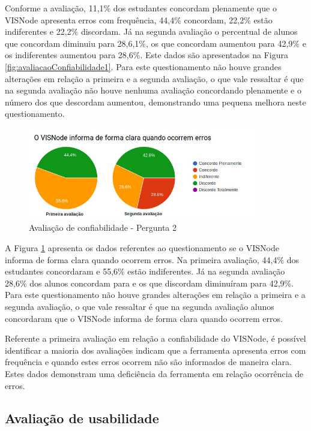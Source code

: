 \documentclass[
	12pt,				%
	oneside,			%
	a4paper,			%
	english,			%
	french,				%
	spanish,			%
	brazil,				%
	]{abntex2}
\begin{document}
Conforme a avaliação, 11,1\% dos estudantes concordam plenamente que o VISNode apresenta erros com frequência, 44,4\% concordam, 22,2\% estão indiferentes e 22,2\% discordam. Já na segunda avaliação o percentual de alunos que concordam diminuiu para 28,6,1\%, os que concordam aumentou para 42,9\% e os indiferentes aumentou para 28,6\%. Este dados são apresentados na Figura  \ref{fig:avaliacaoConfiabilidade1}.
Para este questionamento não houve grandes alterações em relação a primeira e a segunda avaliação, o que vale ressaltar é que na segunda avaliação não houve nenhuma avaliação concordando plenamente e o número dos que descordam aumentou, demonstrando uma pequena melhora neste questionamento.

\begin{figure}[H]
\centering
\caption{Avaliação de confiabilidade - Pergunta 2}\label{fig:avaliacaoConfiabilidade2}
\includegraphics[width=0.9\textwidth]{imagens/avaliacoes/avaliacao_confiabilidade_2.jpg}
\sourceAuthor
\end{figure}

A Figura \ref{fig:avaliacaoConfiabilidade2} apresenta os dados referentes ao questionamento se o VISNode informa de forma clara quando ocorrem erros. Na primeira avaliação, 44,4\% dos estudantes concordaram e 55,6\% estão indiferentes. Já na segunda avaliação 28,6\% dos alunos concordam  para e os que discordam diminuíram para 42,9\%. Para este questionamento não houve grandes alterações em relação a primeira e a segunda avaliação, o que vale ressaltar é que na segunda avaliação alunos concordaram que o VISNode informa de forma clara quando ocorrem erros.

Referente a primeira avaliação em relação a confiabilidade do VISNode, é possível identificar a maioria dos avaliações indicam que a ferramenta apresenta erros com frequência e quando estes erros ocorrem não são informados de maneira clara. Estes dados demonstram uma deficiência da ferramenta em relação ocorrência de erros.

\subsection{Avaliação de usabilidade}
\end{document}

